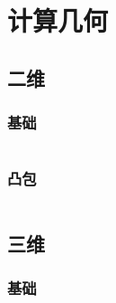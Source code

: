 \chapter{计算几何}
\section{二维}
\subsection{基础}
\inputminted{cpp}{\source/computational-geometry/2d/basis.cpp}
\subsection{凸包}
\inputminted{cpp}{\source/computational-geometry/2d/convex.cpp}
\section{三维}
\subsection{基础}
\inputminted{cpp}{\source/computational-geometry/3d/basis.cpp}
